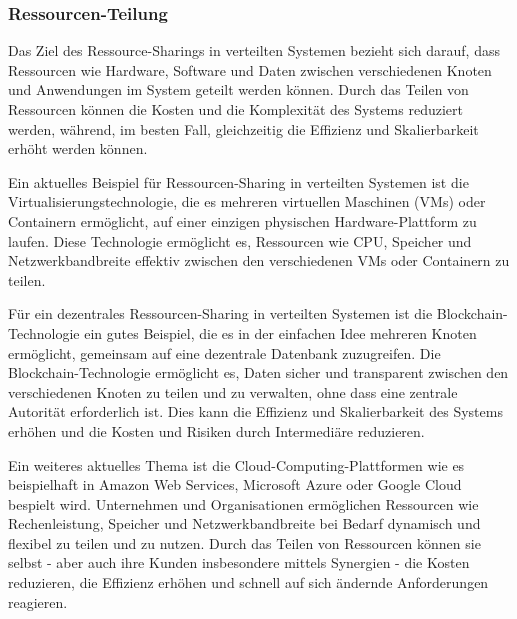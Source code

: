 \documentclass[../vs-script-first-v01.tex]{subfiles}
\begin{document}
\subsubsection{Ressourcen-Teilung}
Das Ziel des Ressource-Sharings in verteilten Systemen bezieht sich darauf, dass Ressourcen wie Hardware, Software und Daten zwischen verschiedenen Knoten und Anwendungen im System geteilt werden können. Durch das Teilen von Ressourcen können die Kosten und die Komplexität des Systems reduziert werden, während, im besten Fall, gleichzeitig die Effizienz und Skalierbarkeit erhöht werden können.

Ein aktuelles Beispiel für Ressourcen-Sharing in verteilten Systemen ist die Virtualisierungstechnologie, die es mehreren virtuellen Maschinen (VMs) oder Containern ermöglicht, auf einer einzigen physischen Hardware-Plattform zu laufen. Diese Technologie ermöglicht es, Ressourcen wie CPU, Speicher und Netzwerkbandbreite effektiv zwischen den verschiedenen VMs oder Containern zu teilen.

Für ein dezentrales Ressourcen-Sharing in verteilten Systemen ist die Blockchain-Technologie ein gutes Beispiel, die es in der einfachen Idee mehreren Knoten ermöglicht, gemeinsam auf eine dezentrale Datenbank zuzugreifen. Die Blockchain-Technologie ermöglicht es, Daten sicher und transparent zwischen den verschiedenen Knoten zu teilen und zu verwalten, ohne dass eine zentrale Autorität erforderlich ist. Dies kann die Effizienz und Skalierbarkeit des Systems erhöhen und die Kosten und Risiken durch Intermediäre reduzieren.

Ein weiteres aktuelles Thema ist die Cloud-Computing-Plattformen wie es beispielhaft in Amazon Web Services, Microsoft Azure oder Google Cloud bespielt wird. Unternehmen und Organisationen ermöglichen Ressourcen wie Rechenleistung, Speicher und Netzwerkbandbreite bei Bedarf dynamisch und flexibel zu teilen und zu nutzen. Durch das Teilen von Ressourcen können sie selbst - aber auch ihre Kunden insbesondere mittels Synergien - die Kosten reduzieren, die Effizienz erhöhen und schnell auf sich ändernde Anforderungen reagieren.
\end{document}
